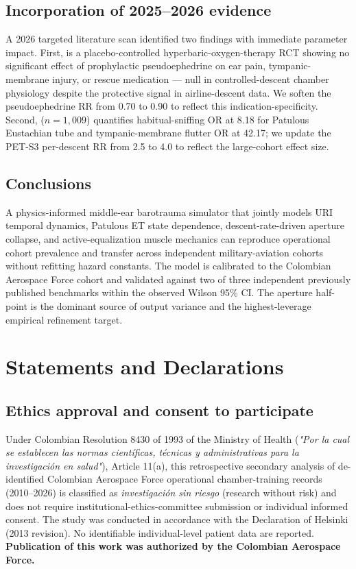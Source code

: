 \documentclass[11pt,a4paper]{article}
\begin{document}
\subsection{Incorporation of 2025--2026 evidence}

A 2026 targeted literature scan identified two findings with immediate parameter impact. First, \citet{Moayedi2025} is a placebo-controlled hyperbaric-oxygen-therapy RCT showing no significant effect of prophylactic pseudoephedrine on ear pain, tympanic-membrane injury, or rescue medication --- null in controlled-descent chamber physiology despite the protective signal in airline-descent data. We soften the pseudoephedrine RR from 0.70 to 0.90 to reflect this indication-specificity. Second, \citet{Oshima2025} ($n = 1{,}009$) quantifies habitual-sniffing OR at 8.18 for Patulous Eustachian tube and tympanic-membrane flutter OR at 42.17; we update the PET-S3 per-descent RR from 2.5 to 4.0 to reflect the large-cohort effect size.

\subsection{Conclusions}

A physics-informed middle-ear barotrauma simulator that jointly models URI temporal dynamics, Patulous ET state dependence, descent-rate-driven aperture collapse, and active-equalization muscle mechanics can reproduce operational cohort prevalence and transfer across independent military-aviation cohorts without refitting hazard constants. The model is calibrated to the Colombian Aerospace Force cohort and validated against two of three independent previously published benchmarks within the observed Wilson 95\% CI. The aperture half-point is the dominant source of output variance and the highest-leverage empirical refinement target.



\section{Statements and Declarations}

\subsection{Ethics approval and consent to participate}

Under Colombian Resolution 8430 of 1993 of the Ministry of Health (\textit{"Por la cual se establecen las normas científicas, técnicas y administrativas para la investigación en salud"}), Article 11(a), this retrospective secondary analysis of de-identified Colombian Aerospace Force operational chamber-training records (2010--2026) is classified as \textit{investigación sin riesgo} (research without risk) and does not require institutional-ethics-committee submission or individual informed consent. The study was conducted in accordance with the Declaration of Helsinki (2013 revision). No identifiable individual-level patient data are reported. \textbf{Publication of this work was authorized by the Colombian Aerospace Force.}
\end{document}
